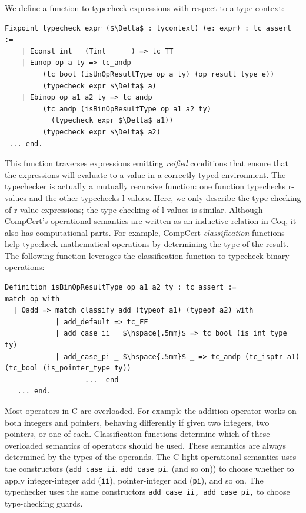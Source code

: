 \documentclass{puthesis}
\begin{document}
We define a function to typecheck expressions with respect to a type context:

\begin{lstlisting}
Fixpoint typecheck_expr ($\Delta$ : tycontext) (e: expr) : tc_assert :=
    | Econst_int _ (Tint _ _ _) => tc_TT 
    | Eunop op a ty => tc_andp 
         (tc_bool (isUnOpResultType op a ty) (op_result_type e)) 
         (typecheck_expr $\Delta$ a) 
    | Ebinop op a1 a2 ty => tc_andp 
         (tc_andp (isBinOpResultType op a1 a2 ty)  
           (typecheck_expr $\Delta$ a1)) 
         (typecheck_expr $\Delta$ a2)
 ... end.
\end{lstlisting}

\noindent This function traverses expressions emitting \emph{reified}
conditions that ensure that the expressions will evaluate to a value
in a correctly typed environment. The typechecker is actually a
mutually recursive function: one function typechecks r-values and the
other typechecks l-values.  Here, we only describe the type-checking
of r-value expressions; the type-checking of l-values is similar.
Although CompCert's operational semantics are written as an inductive
relation in Coq, it also has computational parts. For example,
CompCert \emph{classification} functions help typecheck mathematical
operations by determining the type of the result. The following
function leverages the classification function to typecheck binary
operations:
\begin{lstlisting}
Definition isBinOpResultType op a1 a2 ty : tc_assert :=
match op with
  | Oadd => match classify_add (typeof a1) (typeof a2) with 
            | add_default => tc_FF
            | add_case_ii _ $\hspace{.5mm}$ => tc_bool (is_int_type ty) 
            | add_case_pi _ $\hspace{.5mm}$ _ => tc_andp (tc_isptr a1) (tc_bool (is_pointer_type ty)) 
                   ...  end   
   ... end.
\end{lstlisting}

Most operators in C are overloaded. For example the addition operator
works on both integers and pointers, behaving differently if given two
integers, two pointers, or one of each.  Classification functions
determine which of these overloaded semantics of operators should be
used. These semantics are always determined by the types of the
operands.  The C light operational semantics uses the constructors
(\lstinline|add_case_ii|, \lstinline|add_case_pi|, (and so on)) to
choose whether to apply integer-integer add (\lstinline|ii|),
pointer-integer add (\lstinline|pi|), and so on.  The typechecker uses
the same constructors \lstinline{add_case_ii, add_case_pi,} to choose
type-checking guards.
\end{document}
